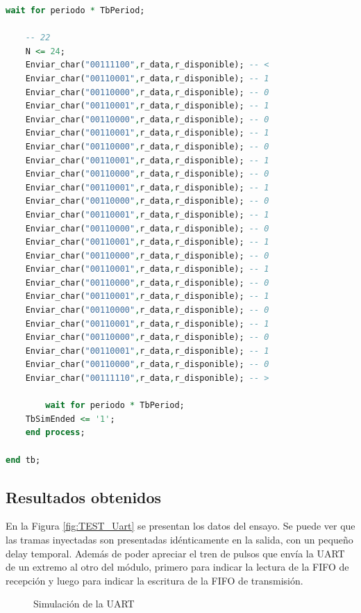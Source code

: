 \begin{lstlisting}[language = vhdl,caption=Testbench del módulo UART,label={lst:test_uart}]
	wait for periodo * TbPeriod;

	-- 22
	N <= 24; 	
	Enviar_char("00111100",r_data,r_disponible); -- < 	
	Enviar_char("00110001",r_data,r_disponible); -- 1 	
	Enviar_char("00110000",r_data,r_disponible); -- 0
 	Enviar_char("00110001",r_data,r_disponible); -- 1 	
	Enviar_char("00110000",r_data,r_disponible); -- 0
	Enviar_char("00110001",r_data,r_disponible); -- 1 	
	Enviar_char("00110000",r_data,r_disponible); -- 0
	Enviar_char("00110001",r_data,r_disponible); -- 1 	
	Enviar_char("00110000",r_data,r_disponible); -- 0
	Enviar_char("00110001",r_data,r_disponible); -- 1 	
	Enviar_char("00110000",r_data,r_disponible); -- 0
	Enviar_char("00110001",r_data,r_disponible); -- 1 	
	Enviar_char("00110000",r_data,r_disponible); -- 0
	Enviar_char("00110001",r_data,r_disponible); -- 1 	
	Enviar_char("00110000",r_data,r_disponible); -- 0
	Enviar_char("00110001",r_data,r_disponible); -- 1 	
	Enviar_char("00110000",r_data,r_disponible); -- 0
	Enviar_char("00110001",r_data,r_disponible); -- 1 	
	Enviar_char("00110000",r_data,r_disponible); -- 0
	Enviar_char("00110001",r_data,r_disponible); -- 1 	
	Enviar_char("00110000",r_data,r_disponible); -- 0
	Enviar_char("00110001",r_data,r_disponible); -- 1 
	Enviar_char("00110000",r_data,r_disponible); -- 0	
	Enviar_char("00111110",r_data,r_disponible); -- >
	
        wait for periodo * TbPeriod;
	TbSimEnded <= '1';
    end process;
	
end tb;

		\end{lstlisting}
			
	\subsection{Resultados obtenidos}
				
		En la Figura \ref{fig:TEST_Uart} se presentan los datos del ensayo. Se puede ver que las tramas inyectadas son presentadas idénticamente en la salida, con un pequeño delay temporal. Además de poder apreciar el tren de pulsos que envía la UART de un extremo al otro del módulo, primero para indicar la lectura de la FIFO de recepción y luego para indicar la escritura de la FIFO de transmisión.
		
		\begin{figure}[h]
		\centering
			\caption{Simulación de la UART}
			\label{fig:Test_UART}
		\end{figure}
			
